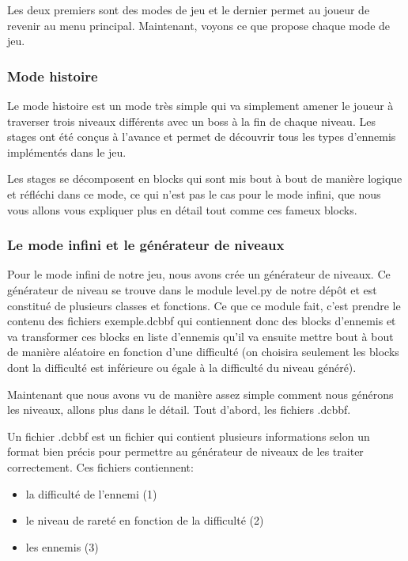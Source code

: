 \documentclass{article}
\begin{document}
Les deux premiers sont des modes de jeu et le dernier permet au joueur de revenir au menu principal. Maintenant, voyons ce que propose chaque mode de jeu.

\subsubsection{Mode histoire}

Le mode histoire est un mode très simple qui va simplement amener le joueur à traverser trois niveaux différents avec un boss à la fin de chaque niveau. Les stages ont été conçus à l'avance et permet de découvrir tous les types d'ennemis implémentés dans le jeu. \newline

Les stages se décomposent en blocks qui sont mis bout à bout de manière logique et réfléchi dans ce mode, ce qui n'est pas le cas pour le mode infini, que nous vous allons vous expliquer plus en détail tout comme ces fameux blocks. 

\subsubsection{Le mode infini et le générateur de niveaux}

Pour le mode infini de notre jeu, nous avons crée un générateur de niveaux. Ce générateur de niveau se trouve dans le module level.py de notre dépôt et est constitué de plusieurs classes et fonctions. Ce que ce module fait, c'est prendre le contenu des fichiers exemple.dcbbf qui contiennent donc des blocks d'ennemis et va transformer ces blocks en liste d'ennemis qu'il va ensuite mettre bout à bout de manière aléatoire en fonction d'une difficulté (on choisira seulement les blocks dont la difficulté est inférieure ou égale à la difficulté du niveau généré). \newline

Maintenant que nous avons vu de manière assez simple comment nous générons les niveaux, allons plus dans le détail. Tout d'abord, les fichiers .dcbbf. \newline

Un fichier .dcbbf est un fichier qui contient plusieurs informations selon un format bien précis pour permettre au générateur de niveaux de les traiter correctement. Ces fichiers contiennent: \newline

\begin{itemize}
	\item la difficulté de l'ennemi (1)
	\item le niveau de rareté en fonction de la difficulté (2)
	\item les ennemis (3) \newline
\end{itemize}
\end{document}
